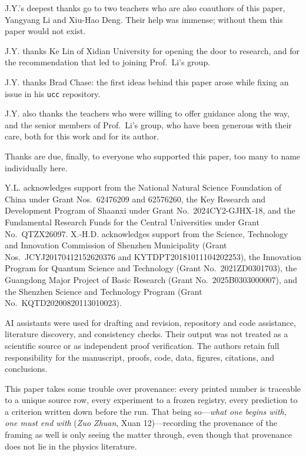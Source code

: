 \documentclass[aps,prx,reprint,floatfix,superscriptaddress]{revtex4-2}
\begin{document}
\begin{acknowledgments}
J.Y.'s deepest thanks go to two teachers who are also coauthors of this
paper, Yangyang Li and Xiu-Hao Deng.  Their help was immense; without them
this paper would not exist.

J.Y. thanks Ke Lin of Xidian University for opening the door to research,
and for the recommendation that led to joining Prof.~Li's group.

J.Y. thanks Brad Chase: the first ideas behind this paper arose while
fixing an issue in his \texttt{ucc} repository.

J.Y. also thanks the teachers who were willing to offer guidance along the
way, and the senior members of Prof.~Li's group, who have been generous
with their care, both for this work and for its author.

Thanks are due, finally, to everyone who supported this paper, too many to
name individually here.

Y.L. acknowledges support from the National Natural Science Foundation of
China under Grant Nos.~62476209 and 62576260, the Key Research and
Development Program of Shaanxi under Grant No.~2024CY2-GJHX-18, and the
Fundamental Research Funds for the Central Universities under Grant
No.~QTZX26097.  X.-H.D. acknowledges
support from the Science, Technology and Innovation Commission of Shenzhen
Municipality (Grant Nos.~JCYJ20170412152620376 and KYTDPT20181011104202253),
the Innovation Program for Quantum Science and Technology (Grant
No.~2021ZD0301703), the Guangdong Major Project of Basic Research (Grant
No.~2025B0303000007), and the Shenzhen Science and Technology Program
(Grant No.~KQTD20200820113010023).

AI assistants were used for drafting and revision, repository and code
assistance, literature discovery, and consistency checks.  Their output was
not treated as a scientific source or as independent proof verification.
The authors retain full responsibility for the manuscript, proofs, code,
data, figures, citations, and conclusions.

This paper takes some trouble over provenance: every printed number is
traceable to a unique source row, every experiment to a frozen registry,
every prediction to a criterion written down before the run.  That being
so---\emph{what one begins with, one must end with} (\emph{Zuo Zhuan},
Xuan 12)---recording the provenance of the framing as well is only seeing
the matter through, even though that provenance does not lie in the physics
literature.


\end{acknowledgments}
\end{document}
